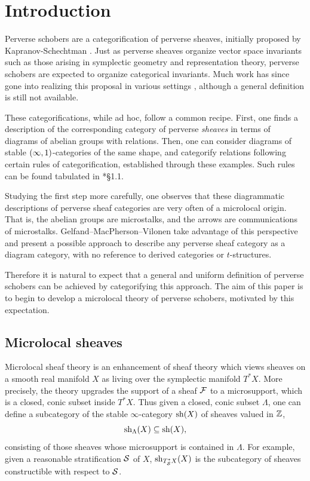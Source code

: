 \section{Introduction}
Perverse schobers are a categorification of perverse sheaves, initially proposed by Kapranov-Schechtman \cite{kapranovPerverseSchobers2015}. Just as perverse sheaves organize vector space invariants such as those arising in symplectic geometry and representation theory, perverse schobers are expected to organize categorical invariants. Much work has since gone into realizing this proposal in various settings \cites{bondalPerverseSchobersBirational2018,christGinzburgAlgebrasTriangulated2022,kapranovPerverseSchobers2015,dyckerhoffPerverseSchobersCoxeter2025}, although a general definition is still not available.

These categorifications, while ad hoc, follow a common recipe. First, one finds a description of the corresponding category of perverse \textit{sheaves} in terms of diagrams of abelian groups with relations. Then, one can consider diagrams of stable $(\infty,1)$-categories of the same shape, and categorify relations following certain rules of categorification, established through these examples. Such rules can be found tabulated in \cite{christLaxAdditivity2025}*{\S 1.1}.

Studying the first step more carefully, one observes that these diagrammatic descriptions of perverse sheaf categories are very often of a microlocal origin. That is, the abelian groups are microstalks, and the arrows are communications of microstalks. Gelfand--MacPherson--Vilonen \cite{gelfandMicrolocalPerverseSheaves2005} take advantage of this perspective and present a possible approach to describe any perverse sheaf category as a diagram category, with no reference to derived categories or $t$-structures.

Therefore it is natural to expect that a general and uniform definition of perverse schobers can be achieved by categorifying this approach. The aim of this paper is to begin to develop a microlocal theory of perverse schobers, motivated by this expectation.

\subsection{Microlocal sheaves}
Microlocal sheaf theory \cite{kashiwaraSheavesManifolds1990} is an enhancement of sheaf theory which views sheaves on a smooth real manifold $X$ as living over the symplectic manifold $T^*X$. More precisely, the theory upgrades the support of a sheaf $\mathcal{F}$ to a microsupport, which is a closed, conic subset inside $T^*X$. Thus given a closed, conic subset $\Lambda$, one can define a subcategory of the stable $\infty$-category $\operatorname{sh}(X)$ of sheaves valued in $\mathbb{Z}$,
\[\operatorname{sh}_{\Lambda}(X)\subseteq \operatorname{sh}(X),\]
consisting of those sheaves whose microsupport is contained in $\Lambda$. For example, given a reasonable stratification $\mathcal{S}$ of $X$, $\operatorname{sh}_{T^*_{\mathcal{S}} X}(X)$ is the subcategory of sheaves constructible with respect to $\mathcal{S}$.

